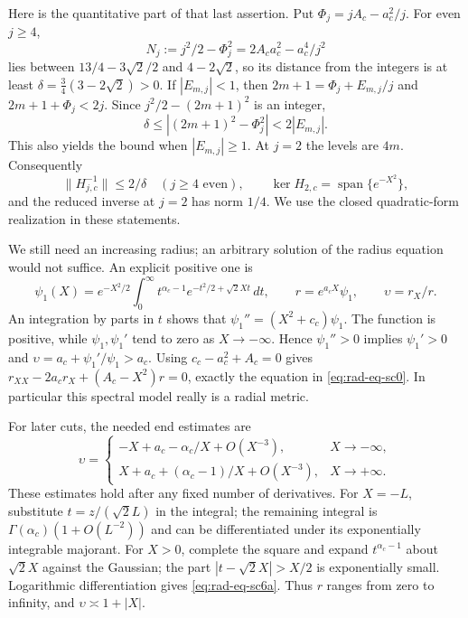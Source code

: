 Here is the quantitative part of that last assertion.  Put
$\Phi_j=jA_c-a_c^2/j$.  For even $j\ge4$,
\[
 N_j:=j^2/2-\Phi_j^2=2A_ca_c^2-a_c^4/j^2
\]
lies between $13/4-3\sqrt2/2$ and $4-2\sqrt2$, so its distance
from the integers is at least
$\delta=\tfrac34(3-2\sqrt2)>0$.
If $|E_{m,j}|<1$, then $2m+1=\Phi_j+E_{m,j}/j$ and
$2m+1+\Phi_j<2j$.  Since $j^2/2-(2m+1)^2$ is an integer,
\[
 \delta\le |(2m+1)^2-\Phi_j^2|<2|E_{m,j}|.
\]
This also yields the bound when $|E_{m,j}|\ge1$.  At $j=2$ the levels
are $4m$.  Consequently
\begin{equation}\label{eq:rad-eq-sc3}
 \|H_{j,c}^{-1}\|\le2/\delta\quad(j\ge4\text{ even}),
 \qquad \ker H_{2,c}=\operatorname{span}\{e^{-X^2}\},
\end{equation}
and the reduced inverse at $j=2$ has norm $1/4$.
We use the closed quadratic-form realization in these statements.

We still need an increasing radius; an arbitrary solution of the radius
equation would not suffice.  An explicit positive one is
\begin{equation}\label{eq:rad-eq-sc6}
 \psi_1(X)=e^{-X^2/2}\int_0^\infty
 t^{\alpha_c-1}e^{-t^2/2+\sqrt2Xt}\,dt,
 \qquad r=e^{a_cX}\psi_1,\qquad \upsilon=r_X/r.
\end{equation}
An integration by parts in $t$ shows that
$\psi_1''=(X^2+c_c)\psi_1$.
The function is positive, while $\psi_1,\psi_1'$ tend to zero as
$X\to-\infty$.  Hence $\psi_1''>0$ implies $\psi_1'>0$ and
$\upsilon=a_c+\psi_1'/\psi_1>a_c$.  Using
$c_c-a_c^2+A_c=0$ gives
$r_{XX}-2a_cr_X+(A_c-X^2)r=0$, exactly the equation in
\eqref{eq:rad-eq-sc0}.  In particular this spectral model really is a
radial metric.

For later cuts, the needed end estimates are
\begin{equation}\label{eq:rad-eq-sc6a}
 \upsilon=
 \begin{cases}
 -X+a_c-\alpha_c/X+O(X^{-3}),&X\to-\infty,\\
 X+a_c+(\alpha_c-1)/X+O(X^{-3}),&X\to+\infty.
 \end{cases}
\end{equation}
These estimates hold after any fixed number of derivatives.  For
$X=-L$, substitute $t=z/(\sqrt2L)$ in the integral; the remaining
integral is $\Gamma(\alpha_c)(1+O(L^{-2}))$ and can be differentiated
under its exponentially integrable majorant.  For $X>0$, complete the
square and expand $t^{\alpha_c-1}$ about $\sqrt2X$ against the Gaussian;
the part $|t-\sqrt2X|>X/2$ is exponentially small.  Logarithmic
differentiation gives \eqref{eq:rad-eq-sc6a}.
Thus $r$ ranges from zero to infinity, and
$\upsilon\asymp1+|X|$.

